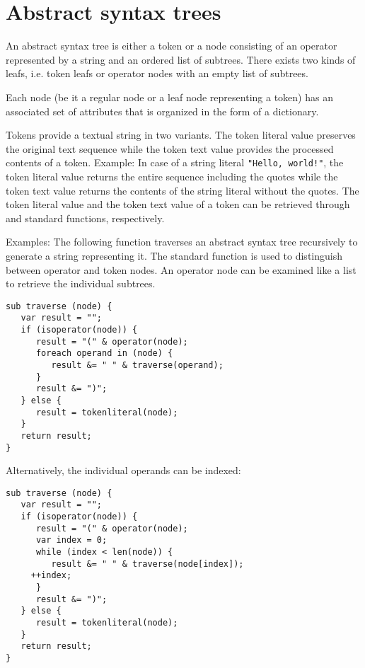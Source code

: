 \section{Abstract syntax trees}

\label{ast}
An abstract syntax tree is either a token or a
node consisting of an operator
represented by a string and an ordered list of subtrees.
There exists two kinds of leafs, i.e. token
leafs or operator nodes with an empty list of subtrees.

Each node (be it a regular node or a leaf node representing a token)
has an associated set of attributes that is organized in the form
of a dictionary.

Tokens provide a textual string in two variants. The token
literal value preserves the original
text sequence while the token text value
provides the processed contents of a token. Example: In case of a
string literal \lstinline+"Hello, world!"+, the token literal value
returns the entire sequence including the quotes while the token
text value returns the contents of the string literal without the
quotes. The token literal value and the token text value of a token
can be retrieved through  and
 standard functions, respectively.

Examples: The following function  traverses an
abstract syntax tree recursively to generate a string representing it.
The standard function  is used to distinguish between
operator and token nodes. An operator node can be examined like a list
to retrieve the individual subtrees.

\begin{lstlisting}
sub traverse (node) {
   var result = "";
   if (isoperator(node)) {
      result = "(" & operator(node);
      foreach operand in (node) {
         result &= " " & traverse(operand);
      }
      result &= ")";
   } else {
      result = tokenliteral(node);
   }
   return result;
}
\end{lstlisting}

\noindent
Alternatively, the individual operands can be indexed:

\begin{lstlisting}
sub traverse (node) {
   var result = "";
   if (isoperator(node)) {
      result = "(" & operator(node);
      var index = 0;
      while (index < len(node)) {
         result &= " " & traverse(node[index]);
	 ++index;
      }
      result &= ")";
   } else {
      result = tokenliteral(node);
   }
   return result;
}
\end{lstlisting}

